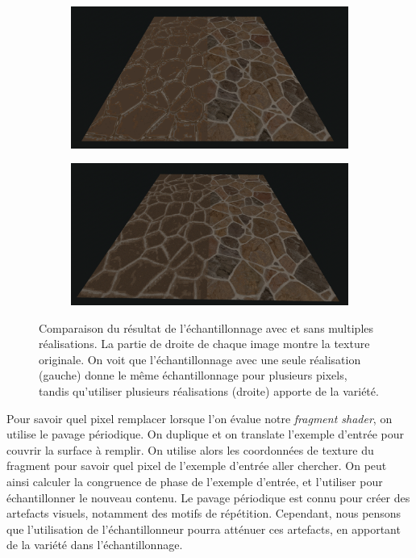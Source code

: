 \begin{figure}
    \centering
    \begin{subfigure}{.485\textwidth}
        \centering
        \includegraphics[width=\textwidth]{contenu/resources/images/partitioned_sampling_pc_preserving_no_shuffle}
    \end{subfigure}
    \hfill
    \begin{subfigure}{.485\textwidth}
        \centering
        \includegraphics[width=\textwidth]{contenu/resources/images/partitioned_sampling_pc_preserving_shuffle_uv}
    \end{subfigure}
    \caption[Échantillonnage avec et sans multiples réalisations]{Comparaison du résultat de l'échantillonnage avec et sans multiples réalisations. La partie de droite de chaque image montre la texture originale. On voit que l'échantillonnage avec une seule réalisation (gauche) donne le même échantillonnage pour plusieurs pixels, tandis qu'utiliser plusieurs réalisations (droite) apporte de la variété.}
    \label{fig:offset-shuffle}
\end{figure}

Pour savoir quel pixel remplacer lorsque l'on évalue notre \textit{fragment shader}, on utilise le pavage périodique. On duplique et on translate l'exemple d'entrée pour couvrir la surface à remplir. On utilise alors les coordonnées de texture du fragment pour savoir quel pixel de l'exemple d'entrée aller chercher. On peut ainsi calculer la congruence de phase de l'exemple d'entrée, et l'utiliser pour échantillonner le nouveau contenu. Le pavage périodique est connu pour créer des artefacts visuels, notamment des motifs de répétition. Cependant, nous pensons que l'utilisation de l'échantillonneur pourra atténuer ces artefacts, en apportant de la variété dans l'échantillonnage.

